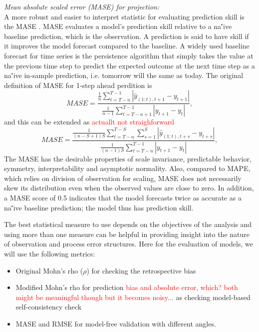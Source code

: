 \documentclass[a4paper]{article}
\newcommand{\disp}{\displaystyle}
\newcommand{\red}{\textcolor{red}}
\begin{document}
\vspace{0.2cm} \noindent
{\it Mean absolute scaled error (MASE) for projection:}\\ 
A more robust and easier to interpret statistic for evaluating prediction skill is the MASE \citep{hyndman2006another}. MASE evaluates a model’s prediction skill relative to a na\''{i}ve baseline prediction, which is the observation. A prediction is said to have skill if it improves the model forecast compared to the baseline. A widely used baseline forecast for time series is the persistence algorithm that simply takes the value at the previous time step to predict the expected outcome at the next time step as a na\''{i}ve in-sample prediction, i.e. tomorrow will the same as today. The original definition of MASE for 1-step ahead perdition is 
\begin{equation}
{MASE=\frac{\disp \frac{1}{n} \sum_{t=T-n}^{T-1} \left| \hat{y}_{(1:t),t+1}-y_{t+1} \right|}
{\disp \frac{1}{n-1} \sum_{t=T-n+1}^{T-1} \left|y_{t+1}-y_{t}\right|}}, 
\end{equation}
and this can be extended as \red{actuallt not straighforward}
\begin{equation}
MASE=
\frac{\disp \frac{1}{(n-S+1)S} \sum_{t=T-n}^{T-S} \sum_{s=1}^S \left| \hat{y}_{(1:t),t+s}-y_{t+s} \right|}
{\disp \frac{1}{(n-1)S} \sum_{t=T-n}^{T-1} \left|y_{t+1}-y_{t}\right|}, 
\end{equation} 
The MASE has the desirable properties of scale invariance, predictable behavior, symmetry, interpretability and asymptotic normality. Also, compared to MAPE, which relies on division of observation for scaling, MASE does not necessarily skew its distribution even when the observed values are close to zero. In addition, a MASE score of 0.5 indicates that the model forecasts twice as accurate as a na\''{i}ve baseline prediction; the model thus has prediction skill.

\vspace{0.2cm} 
The best statistical measure to use depends on the objectives of the analysis and using more than one measure can be helpful in providing insight into the nature of observation and process error structures. Here for the evaluation of models, we will use the following metrics: 
\begin{itemize}
\item Original Mohn's rho ($\rho$) for checking the retrospective bias \\
\vspace{-0.3cm}
\item Modified Mohn's rho for prediction \red{bias and absolute error, which? both might be meaningful though but it becomes noisy...} as checking model-based self-consistency check \\
\vspace{-0.3cm}
\item MASE and RMSE for model-free validation with different angles. 
\end{itemize}



\end{document}
